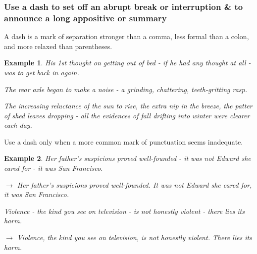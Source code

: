 \documentclass{article}
\newtheorem{example}{Example}
\begin{document}

\subsubsection{Use a dash to set off an abrupt break or interruption \& to announce a long appositive or summary}
A dash is a mark of separation stronger than a comma, less formal than a colon, and more relaxed than parentheses.
\begin{example}
	His 1st thought on getting out of bed - if he had any thought at all - was to get back in again.
	
	The rear axle began to make a noise - a grinding, chattering, teeth-gritting rasp.
	
	The increasing reluctance of the sun to rise, the extra nip in the breeze, the patter of shed leaves dropping - all the evidences of fall drifting into winter were clearer each day.
\end{example}
Use a dash only when a more common mark of punctuation seems inadequate.
\begin{example}
	Her father's suspicions proved well-founded - it was not Edward she cared for - it was San Francisco.
	
	$\to$ Her father's suspicions proved well-founded. It was not Edward she cared for, it was San Francisco.
	
	Violence - the kind you see on television - is not honestly violent - there lies its harm.
	
	$\to$ Violence, the kind you see on television, is not honestly violent. There lies its harm.
\end{example}

\end{document}
